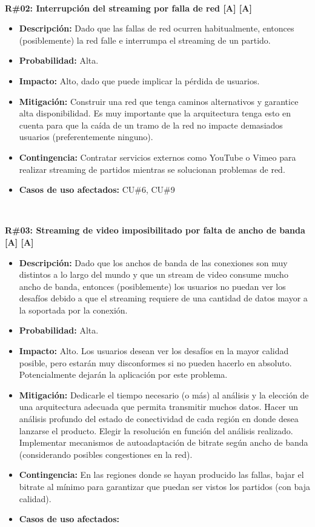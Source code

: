 ~

\noindent\textbf{R\#02: Interrupción del streaming por falla de red [A] [A] } 
\begin{itemize}
	\item{\textbf{Descripción:} Dado que las fallas de red ocurren habitualmente, entonces (posiblemente) la red falle e interrumpa el streaming de un partido.}
	\item{\textbf{Probabilidad:} Alta.}
	\item{\textbf{Impacto:} Alto, dado que puede implicar la pérdida de usuarios.}
	\item{\textbf{Mitigación:} Construir una red que tenga caminos alternativos y garantice alta disponibilidad. Es muy importante que la arquitectura tenga esto en cuenta para que la caída de un tramo de la red no impacte demasiados usuarios (preferentemente ninguno).}
	\item{\textbf{Contingencia:} Contratar servicios externos como YouTube o Vimeo para realizar streaming de partidos mientras se solucionan problemas de red.}
	\item{\textbf{Casos de uso afectados:} CU\#6, CU\#9}
\end{itemize}

~

\noindent\textbf{R\#03: Streaming de video imposibilitado por falta de ancho de banda [A] [A]} 
\begin{itemize}
	\item{\textbf{Descripción:} Dado que los anchos de banda de las conexiones son muy distintos a lo largo del mundo y que un stream de video consume mucho ancho de banda, entonces (posiblemente) los usuarios no puedan ver los desafíos debido a que el streaming requiere de una cantidad de datos mayor a la soportada por la conexión.}
	\item{\textbf{Probabilidad:} Alta.}
	\item{\textbf{Impacto:} Alto. Los usuarios desean ver los desafíos en la mayor calidad posible, pero estarán muy disconformes si no pueden hacerlo en absoluto. Potencialmente dejarán la aplicación por este problema.}
	\item{\textbf{Mitigación:} Dedicarle el tiempo necesario (o más) al análisis y la elección  de una arquitectura adecuada que permita transmitir muchos datos. Hacer un análisis profundo del estado de conectividad de cada región en donde desea lanzarse el producto. Elegir la resolución en función del análisis realizado. Implementar mecanismos de autoadaptación de bitrate según ancho de banda (considerando posibles congestiones en la red).}
	\item{\textbf{Contingencia:} En las regiones donde se hayan producido las fallas, bajar el bitrate al mínimo para garantizar que puedan ser vistos los partidos (con baja calidad).}
	\item{\textbf{Casos de uso afectados:} }
\end{itemize}

